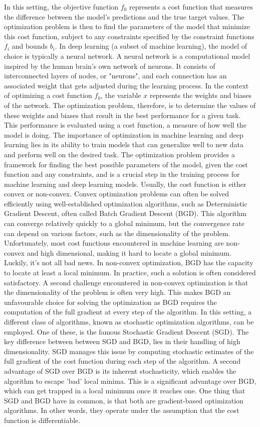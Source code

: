 \newpage
In this setting, the objective function $f_0$ represents a cost function that measures the difference between the model's predictions and the true target values. The optimization problem is then to find the parameters of the model that minimize this cost function, subject to any constraints specified by the constraint functions $f_i$ and bounds $b_i$. In deep learning (a subset of machine learning), the model of choice is typically a neural network. A neural network is a computational model inspired by the human brain's own network of neurons. It consists of interconnected layers of nodes, or "neurons", and each connection has an associated weight that gets adjusted during the learning process. In the context of optimizing a cost function $f_0$, the variable $x$ represents the weights and biases of the network. The optimization problem, therefore, is to determine the values of these weights and biases that result in the best performance for a given task. This performance is evaluated using a cost function, a measure of how well the model is doing. The importance of optimization in machine learning and deep learning lies in its ability to train models that can generalize well to new data and perform well on the desired task. The optimization problem provides a framework for finding the best possible parameters of the model, given the cost function and any constraints, and is a crucial step in the training process for machine learning and deep learning models. Usually, the cost function is either convex or non-convex. Convex optimization problems can often be solved efficiently using well-established optimization algorithms, such as Deterministic Gradient Descent, often called Batch Gradient Descent (BGD). This algorithm can converge relatively quickly to a global minimum, but the convergence rate can depend on various factors, such as the dimensionality of the problem. Unfortunately, most cost functions encountered in machine learning are non-convex and high dimensional, making it hard to locate a global minimum. Luckily, it's not all bad news. In non-convex optimization, BGD has the capacity to locate at least a local minimum. In practice, such a solution is often considered satisfactory. A second challenge encountered in non-convex optimization is that the dimensionality of the problem is often very high. This makes BGD an unfavourable choice for solving the optimization as BGD requires the computation of the full gradient at every step of the algorithm. In this setting, a different class of algorithms, known as stochastic optimization algorithms, can be employed. One of these, is the famous Stochastic Gradient Descent (SGD). The key difference between between SGD and BGD, lies in their handling of high dimensionality. SGD manages this issue by computing stochastic estimates of the full gradient of the cost function during each step of the algorithm. A second advantage of SGD over BGD is its inherent stochasticity, which enables the algorithm to escape 'bad' local minima. This is a significant advantage over BGD, which can get trapped in a local minimum once it reaches one. One thing that SGD and BGD have in common, is that both are gradient-based optimization algorithms. In other words, they operate under the assumption that the cost function is differentiable. 